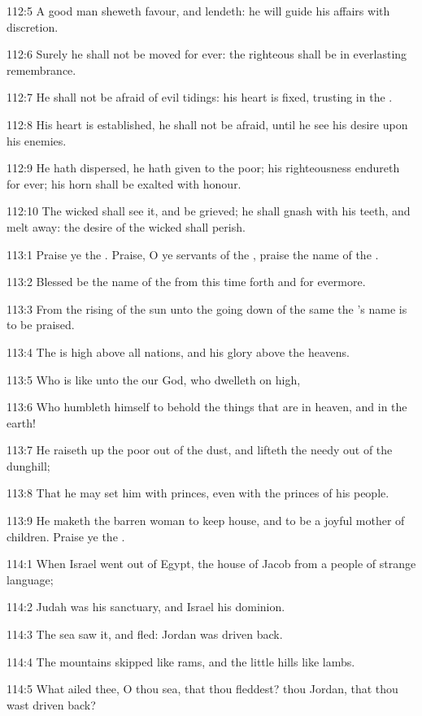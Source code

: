 112:5 A good man sheweth favour, and lendeth: he will guide his
affairs with discretion.

112:6 Surely he shall not be moved for ever: the righteous shall be in
everlasting remembrance.

112:7 He shall not be afraid of evil tidings: his heart is fixed,
trusting in the \LORD.

112:8 His heart is established, he shall not be afraid, until he see
his desire upon his enemies.

112:9 He hath dispersed, he hath given to the poor; his righteousness
endureth for ever; his horn shall be exalted with honour.

112:10 The wicked shall see it, and be grieved; he shall gnash with
his teeth, and melt away: the desire of the wicked shall perish.



113:1 Praise ye the \LORD. Praise, O ye servants of the \LORD, praise
the name of the \LORD.

113:2 Blessed be the name of the \LORD from this time forth and for
evermore.

113:3 From the rising of the sun unto the going down of the same the
\LORD's name is to be praised.

113:4 The \LORD is high above all nations, and his glory above the
heavens.

113:5 Who is like unto the \LORD our God, who dwelleth on high,

113:6 Who humbleth himself to behold the things that are in heaven,
and in the earth!

113:7 He raiseth up the poor out of the dust, and lifteth the needy
out of the dunghill;

113:8 That he may set him with princes, even with the princes of his
people.

113:9 He maketh the barren woman to keep house, and to be a joyful
mother of children. Praise ye the \LORD.



114:1 When Israel went out of Egypt, the house of Jacob from a people
of strange language;

114:2 Judah was his sanctuary, and Israel his dominion.

114:3 The sea saw it, and fled: Jordan was driven back.

114:4 The mountains skipped like rams, and the little hills like
lambs.

114:5 What ailed thee, O thou sea, that thou fleddest? thou Jordan,
that thou wast driven back?

